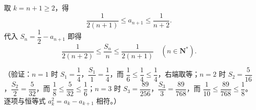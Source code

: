 \begin{answer}
取 \(k=n+1\geqslant2\)，得
\nopagebreak[4]
\[
\frac{1}{2(n+1)}\leqslant a_{n+1}\leqslant\frac{1}{n+2}.
\]
代入 \(S_n=\dfrac12-a_{n+1}\) 即得
\nopagebreak[4]
\[
\frac{1}{2(n+2)}\leqslant\frac{S_n}{n}\leqslant\frac{1}{2(n+1)}
\quad(n\in\mathbf{N}^*).
\]

（验证：\(n=1\) 时 \(S_1=\dfrac14\)，\(\dfrac{S_1}{1}=\dfrac14\)，而 \(\dfrac16\leqslant\dfrac14\leqslant\dfrac14\)，右端取等；\(n=2\) 时 \(S_2=\dfrac{5}{16}\)，\(\dfrac{S_2}{2}=\dfrac{5}{32}\)，而 \(\dfrac18\leqslant\dfrac{5}{32}\leqslant\dfrac16\)；\(n=3\) 时 \(S_3=\dfrac{89}{256}\)，\(\dfrac{S_3}{3}=\dfrac{89}{768}\)，而 \(\dfrac{1}{10}\leqslant\dfrac{89}{768}\leqslant\dfrac18\)。逐项与恒等式 \(a_k^2=a_k-a_{k+1}\) 相符。）

\gkanswer{答案（1）：成立（\(\dfrac{a_n}{a_{n+1}}=\dfrac{1}{1-a_n}\)，由 \(0<a_n\leqslant\dfrac12\) 得 \(\dfrac{1}{1-a_n}\in[1,2)\)）。}


\end{answer}